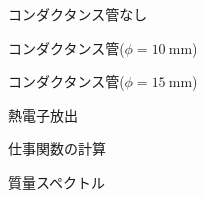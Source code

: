 \documentclass[uplatex,a4j,11pt,dvipdfmx]{jsarticle}
\newcommand{\gnu}[2]{
\begin{figure}[hptb]
\begin{center}

\caption{#1}
\label{fig:#2}
\end{center}
\end{figure}
}
\begin{document}
\gnu{コンダクタンス管なし}{graph/nopipe/all.tex}
\gnu{コンダクタンス管($\phi=10\ \si{\milli\metre}$)}{graph/thin/all.tex}
\gnu{コンダクタンス管($\phi=15\ \si{\milli\metre}$)}{graph/thick/all.tex}
\gnu{熱電子放出}{graph/thermion/all.tex}
\gnu{仕事関数の計算}{graph/thermion/wf.tex}
\gnu{質量スペクトル}{graph/mass/mass.tex}

\end{document}
